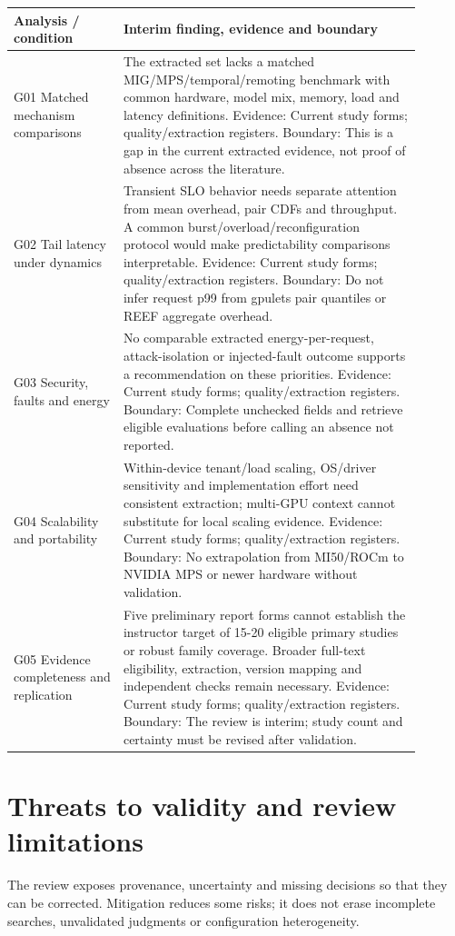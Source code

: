 \documentclass[12pt,a4paper]{article}
\begin{document}
\begin{longtable}{p{0.24\linewidth}p{0.65\linewidth}}
\toprule
Analysis /\allowbreak{} condition & Interim finding, evidence and boundary\\\midrule
\endhead
G01 Matched mechanism comparisons & The extracted set lacks a matched MIG/\allowbreak{}MPS/\allowbreak{}temporal/\allowbreak{}remoting benchmark with common hardware, model mix, memory, load and latency definitions. Evidence: Current study forms; quality/\allowbreak{}extraction registers. Boundary: This is a gap in the current extracted evidence, not proof of absence across the literature.\\
G02 Tail latency under dynamics & Transient SLO behavior needs separate attention from mean overhead, pair CDFs and throughput. A common burst/\allowbreak{}overload/\allowbreak{}reconfiguration protocol would make predictability comparisons interpretable. Evidence: Current study forms; quality/\allowbreak{}extraction registers. Boundary: Do not infer request p99 from gpulets pair quantiles or REEF aggregate overhead.\\
G03 Security, faults and energy & No comparable extracted energy-per-request, attack-isolation or injected-fault outcome supports a recommendation on these priorities. Evidence: Current study forms; quality/\allowbreak{}extraction registers. Boundary: Complete unchecked fields and retrieve eligible evaluations before calling an absence not reported.\\
G04 Scalability and portability & Within-device tenant/\allowbreak{}load scaling, OS/\allowbreak{}driver sensitivity and implementation effort need consistent extraction; multi-GPU context cannot substitute for local scaling evidence. Evidence: Current study forms; quality/\allowbreak{}extraction registers. Boundary: No extrapolation from MI50/\allowbreak{}ROCm to NVIDIA MPS or newer hardware without validation.\\
G05 Evidence completeness and replication & Five preliminary report forms cannot establish the instructor target of 15-20 eligible primary studies or robust family coverage. Broader full-text eligibility, extraction, version mapping and independent checks remain necessary. Evidence: Current study forms; quality/\allowbreak{}extraction registers. Boundary: The review is interim; study count and certainty must be revised after validation.\\
\bottomrule
\end{longtable}

\section{Threats to validity and review limitations}
The review exposes provenance, uncertainty and missing decisions so that they can be corrected. Mitigation reduces some risks; it does not erase incomplete searches, unvalidated judgments or configuration heterogeneity.
\end{document}
